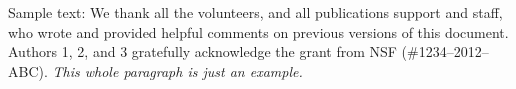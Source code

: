\documentclass{sigchi}
\begin{document}
Sample text: We thank all the volunteers, and all publications support
and staff, who wrote and provided helpful comments on previous
versions of this document. Authors 1, 2, and 3 gratefully acknowledge
the grant from NSF (\#1234--2012--ABC). \textit{This whole paragraph is
  just an example.}

%
%
%
%
%
\balance{}

%

\balance{}



\end{document}

